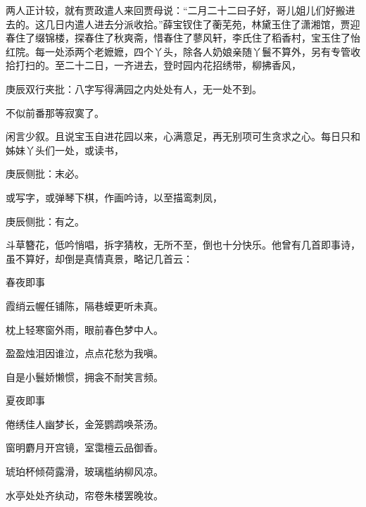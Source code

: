 \begin{parag}
    两人正计较，就有贾政遣人来回贾母说：“二月二十二曰子好，哥儿姐儿们好搬进去的。这几日内遣人进去分派收拾。”薛宝钗住了蘅芜苑，林黛玉住了潇湘馆，贾迎春住了缀锦楼，探春住了秋爽斋，惜春住了蓼风轩，李氏住了稻香村，宝玉住了怡红院。每一处添两个老嬷嬷，四个丫头，除各人奶娘亲随丫鬟不算外，另有专管收拾打扫的。至二十二日，一齐进去，登时园内花招绣带，柳拂香风，\begin{note}庚辰双行夹批：八字写得满园之内处处有人，无一处不到。\end{note}不似前番那等寂寞了。
\end{parag}


\begin{parag}
    闲言少叙。且说宝玉自进花园以来，心满意足，再无别项可生贪求之心。每日只和姊妹丫头们一处，或读书，\begin{note}庚辰侧批：末必。\end{note}或写字，或弹琴下棋，作画吟诗，以至描鸾刺凤，\begin{note}庚辰侧批：有之。\end{note}斗草簪花，低吟悄唱，拆字猜枚，无所不至，倒也十分快乐。他曾有几首即事诗，虽不算好，却倒是真情真景，略记几首云：
\end{parag}


\begin{poem}
    \begin{pl}春夜即事\end{pl}

    \begin{pl}霞绡云幄任铺陈，隔巷蟆更听未真。\end{pl}

    \begin{pl}枕上轻寒窗外雨，眼前春色梦中人。\end{pl}

    \begin{pl}盈盈烛泪因谁泣，点点花愁为我嗔。\end{pl}

    \begin{pl}自是小鬟娇懒惯，拥衾不耐笑言频。\end{pl}
\end{poem}
\begin{poem}
    \begin{pl}夏夜即事\end{pl}

    \begin{pl}倦绣佳人幽梦长，金笼鹦鹉唤茶汤。\end{pl}

    \begin{pl}窗明麝月开宫镜，室霭檀云品御香。\end{pl}

    \begin{pl}琥珀杯倾荷露滑，玻璃槛纳柳风凉。\end{pl}

    \begin{pl}水亭处处齐纨动，帘卷朱楼罢晚妆。\end{pl}

\end{poem}

